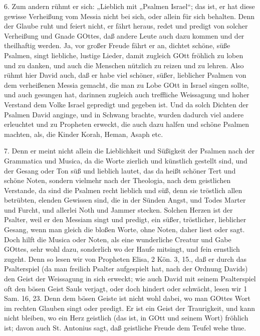 6. Zum andern rühmt er sich: „Lieblich mit
„Psalmen Israel“; das ist, er hat diese gewisse Verheißung vom Messia nicht bei sich, oder allein für sich behalten. Denn der Glaube ruht und feiert nicht, er fährt heraus, redet und predigt von solcher Verheißung und Gnade GOttes, daß andere Leute auch dazu kommen und der theilhaftig werden. Ja, vor großer Freude fährt er an, dichtet schöne, süße Psalmen, singt liebliche, lustige Lieder, damit zugleich GOtt fröhlich zu loben und zu danken, und auch die Menschen nützlich zu reizen und zu lehren. Also rühmt hier David auch, daß er habe viel schöner, süßer, lieblicher Psalmen von dem verheißenen Messia gemacht, die man zu Lobe GOtt in Israel singen sollte, und auch gesungen hat, darinnen zugleich auch treffliche Weissagung und hoher Verstand dem Volke Israel gepredigt und gegeben ist. Und da solch Dichten der Psalmen David anginge, und in Schwang brachte, wurden dadurch viel andere erleuchtet und zu Propheten erweckt, die auch dazu halfen und schöne Psalmen machten, als, die Kinder Korah, Heman, Asaph etc.

7. Denn er meint nicht allein die Lieblichkeit und Süßigkeit der Psalmen nach der Grammatica und Musica, da die Worte zierlich und künstlich gestellt sind, und der Gesang oder Ton süß und lieblich lautet, das da heißt schöner Tert und schöne Noten, sondern vielmehr nach der Theologia, nach dem geistlichen Verstande, da sind die Psalmen recht lieblich und süß, denn sie tröstlich allen betrübten, elenden Gewissen sind, die in der Sünden Angst, und Todes Marter und Furcht, und allerlei Noth und Jammer stecken. Solchen Herzen ist der Psalter, weil er den Messiam singt und predigt, ein süßer, tröstlicher, lieblicher Gesang, wenn man gleich die bloßen Worte, ohne Noten, daher liest oder sagt. Doch hilft die Musica oder Noten, als eine wunderliche Creatur und Gabe GOttes, sehr wohl dazu, sonderlich wo der Haufe mitsingt, und fein ernstlich zugeht. Denn so lesen wir von Propheten Elisa, 2 Kön. 3, 15., daß er durch das Psalterspiel (da man freilich Psalter aufgespielt hat, nach der Ordnung Davids) den Geist der Weissagung in sich erweckt; wie auch David mit seinem Psalterspiel oft den bösen Geist Sauls verjagt, oder doch hindert oder schwächt, lesen wir 1 Sam. 16, 23. Denn dem bösen Geiste ist nicht wohl dabei, wo man GOttes Wort im rechten Glauben singt oder predigt. Er ist ein Geist der Traurigkeit, und kann nicht bleiben, wo ein Herz geistlich (das ist, in GOtt und seinem Wort) fröhlich ist; davon auch St. Antonius sagt, daß geistliche Freude dem Teufel wehe thue.

